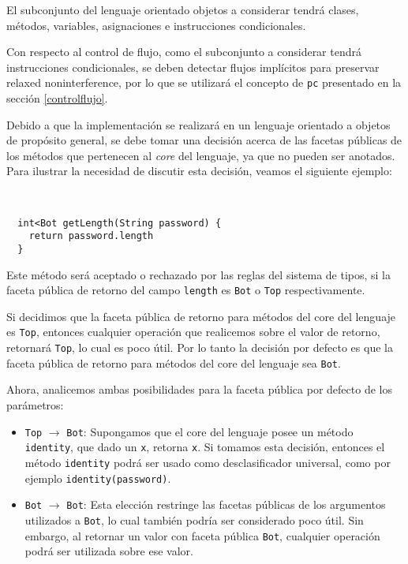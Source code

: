 El subconjunto del lenguaje orientado objetos a considerar tendrá clases, métodos, variables, asignaciones e instrucciones condicionales.

Con respecto al control de flujo, como el subconjunto a considerar tendrá instrucciones condicionales, se deben detectar flujos implícitos para preservar relaxed noninterference, por lo que se utilizará el concepto de \texttt{pc} presentado en la sección \ref{controlflujo}.

Debido a que la implementación se realizará en un lenguaje orientado a objetos de propósito general, se debe tomar una decisión acerca de las facetas públicas de los métodos que pertenecen al \emph{core} del lenguaje, ya que no pueden ser anotados. Para ilustrar la necesidad de discutir esta decisión, veamos el siguiente ejemplo:

\begin{ej} \ \\
  \label{ej-necesidad}
  \normalfont
\begin{lstlisting}
  int<Bot getLength(String password) {
    return password.length
  }
\end{lstlisting}
\end{ej}



Este método será aceptado o rechazado por las reglas del sistema de tipos, si la faceta pública de retorno del campo \texttt{length} es \texttt{Bot} o \texttt{Top} respectivamente.

Si decidimos que la faceta pública de retorno para métodos del core del lenguaje es \texttt{Top}, entonces cualquier operación que realicemos sobre el valor de retorno, retornará \texttt{Top}, lo cual es poco útil. Por lo tanto la decisión por defecto es que la faceta pública de retorno para métodos del core del lenguaje sea \texttt{Bot}.

Ahora, analicemos ambas posibilidades para la faceta pública por defecto de los parámetros:

\begin{itemize}
  \item \texttt{Top} $\rightarrow$ \texttt{Bot}: Supongamos que el core del lenguaje posee un método \texttt{identity}, que dado un \texttt{x}, retorna \texttt{x}. Si tomamos esta decisión, entonces el método \texttt{identity} podrá ser usado como desclasificador universal, como por ejemplo \texttt{identity(password)}.
  \item \texttt{Bot} $\rightarrow$ \texttt{Bot}: Esta elección restringe las facetas públicas de los argumentos utilizados a \texttt{Bot}, lo cual también podría ser considerado poco útil. Sin embargo, al retornar un valor con faceta pública \texttt{Bot}, cualquier operación podrá ser utilizada sobre ese valor.
\end{itemize}

